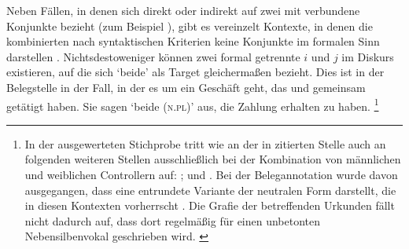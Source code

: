 Neben Fällen, in denen sich  direkt oder indirekt auf zwei mit
 verbundene Konjunkte bezieht (zum Beispiel ), gibt es vereinzelt Kontexte, in denen die
kombinierten  nach syntaktischen Kriterien keine Konjunkte im
formalen Sinn darstellen \autocite[vgl.~auch][247--248]{askedal1973}.
Nichtsdestoweniger können zwei formal getrennte  $i$ und $j$ im
Diskurs existieren, auf die sich  `beide' als Target gleichermaßen
bezieht. Dies ist in der Belegstelle in  der Fall, in
der es um ein Geschäft geht, das  und  gemeinsam getätigt
haben. Sie sagen  `beide (\textsc{n.pl})' aus, die Zahlung erhalten
zu haben.%
%
	\footnote{In der ausgewerteten Stichprobe tritt  wie an der in
		 zitierten Stelle auch an folgenden weiteren
		Stellen ausschließlich bei der Kombination von männlichen und
		weiblichen Controllern auf:
		\citet[124,23; Nr.~81, Kl.~Tennenbach, Kr.~Emmendingen, 1264]{cao1};
		\citet[205,38--39; Nr.~190, Basel, 1273]{cao1} und
		\citet[175,14; Nr.~N~230, Straßburg, 1283]{cao5}.
		Bei der Belegannotation wurde davon ausgegangen, dass
		 eine entrundete Variante der neutralen Form 
		darstellt, die in diesen Kontexten vorherrscht \autocites(siehe auch
		Anhang~\ref{sec:caoalemschwa})[vgl.][41]{paul2007}. Die Grafie der
		betreffenden Urkunden fällt nicht dadurch auf, dass dort regelmäßig
		 für einen unbetonten Nebensilbenvokal geschrieben wird.
		\label{fn:caoalemschwa}}



